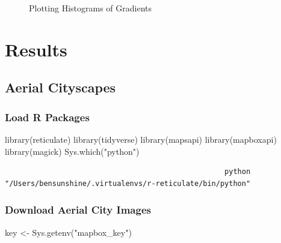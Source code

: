 \documentclass[
  letterpaper,
  DIV=11,
  numbers=noendperiod]{scrreprt}
\newenvironment{Shaded}{\begin{snugshade}}{\end{snugshade}}
\newcommand{\FunctionTok}[1]{\textcolor[rgb]{0.28,0.35,0.67}{#1}}
\newcommand{\NormalTok}[1]{\textcolor[rgb]{0.00,0.23,0.31}{#1}}
\newcommand{\OtherTok}[1]{\textcolor[rgb]{0.00,0.23,0.31}{#1}}
\newcommand{\StringTok}[1]{\textcolor[rgb]{0.13,0.47,0.30}{#1}}
\begin{document}
\begin{figure}
\begin{minipage}{0.25\linewidth}
\begin{figure}[H]
{}


\end{figure}%

\end{minipage}%

\caption{\label{fig-histograms-plot-diag-line}Plotting Histograms of
Gradients}

\end{figure}%

\part{Results}

\chapter{Aerial Cityscapes}\label{aerial-cityscapes}

\section{Load R Packages}\label{load-r-packages}

\begin{Shaded}
\begin{Highlighting}[]
\FunctionTok{library}\NormalTok{(reticulate)}
\FunctionTok{library}\NormalTok{(tidyverse)}
\FunctionTok{library}\NormalTok{(mapsapi)}
\FunctionTok{library}\NormalTok{(mapboxapi)}
\FunctionTok{library}\NormalTok{(magick)}
\FunctionTok{Sys.which}\NormalTok{(}\StringTok{"python"}\NormalTok{)}
\end{Highlighting}
\end{Shaded}

\begin{verbatim}
                                                   python 
"/Users/bensunshine/.virtualenvs/r-reticulate/bin/python" 
\end{verbatim}

\section{Download Aerial City Images}\label{download-aerial-city-images}

\begin{Shaded}
\begin{Highlighting}[]
\NormalTok{key }\OtherTok{\textless{}{-}} \FunctionTok{Sys.getenv}\NormalTok{(}\StringTok{"mapbox\_key"}\NormalTok{) }
\end{Highlighting}
\end{Shaded}
\end{document}
